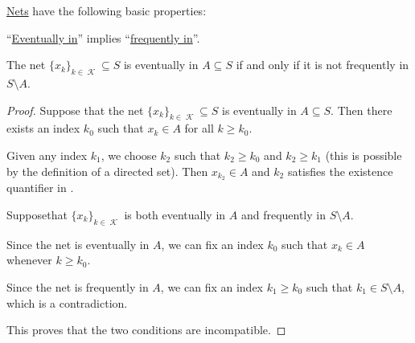 \begin{proposition}\label{thm:topological_net_properties}
  \hyperref[def:topological_net]{Nets} have the following basic properties:

  \begin{thmenum}
     \enquote{\hyperref[def:topological_net/eventually_in]{Eventually in}} implies \enquote{\hyperref[def:topological_net/frequently_in]{frequently in}}.

     The net \( \{ x_k \}_{k \in \mscrK} \subseteq S \) is eventually in \( A \subseteq S \) if and only if it is not frequently in \( S \setminus A \).
  \end{thmenum}
\end{proposition}
\begin{proof}
   Suppose that the net \( \{ x_k \}_{k \in \mscrK} \subseteq S \) is eventually in \( A \subseteq S \). Then there exists an index \( k_0 \) such that \( x_k \in A \) for all \( k \geq k_0 \).

  Given any index \( k_1 \), we choose \( k_2 \) such that \( k_2 \geq k_0 \) and \( k_2 \geq k_1 \) (this is possible by the definition of a directed set). Then \( x_{k_2} \in A \) and \( k_2 \) satisfies the existence quantifier in .

   Suppose\LEM that \( \{ x_k \}_{k \in \mscrK} \) is both eventually in \( A \) and frequently in \( S \setminus A \).

  Since the net is eventually in \( A \), we can fix an index \( k_0 \) such that \( x_k \in A \) whenever \( k \geq k_0 \).

  Since the net is frequently in \( A \), we can fix an index \( k_1 \geq k_0 \) such that \( k_1 \in S \setminus A \), which is a contradiction.

  This proves that the two conditions are incompatible.
\end{proof}

